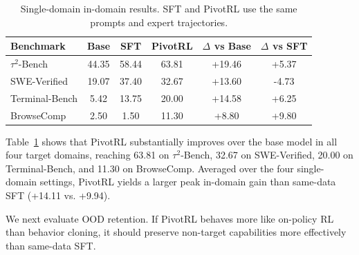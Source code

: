 \begin{table}[t]
\centering
\small
\begin{tabular}{lccccc}
\toprule
\textbf{Benchmark} & \textbf{Base} & \textbf{SFT} & \textbf{PivotRL} & \textbf{$\Delta$ vs Base} & \textbf{$\Delta$ vs SFT} \\
\midrule
$\tau^2$-Bench   & 44.35 & 58.44 & 63.81 & +19.46 & +5.37 \\
SWE-Verified     & 19.07 & 37.40 & 32.67 & +13.60 & -4.73 \\
Terminal-Bench   & 5.42  & 13.75 & 20.00 & +14.58 & +6.25 \\
BrowseComp       & 2.50  & 1.50  & 11.30 & +8.80  & +9.80 \\
\bottomrule
\end{tabular}
\caption{
Single-domain in-domain results.
SFT and PivotRL use the same prompts and expert trajectories.
}
\label{tab:single_domain_main_results}
\end{table}

Table~\ref{tab:single_domain_main_results} shows that PivotRL substantially improves over the base model in all four target domains, reaching 63.81 on $\tau^2$-Bench, 32.67 on SWE-Verified, 20.00 on Terminal-Bench, and 11.30 on BrowseComp. Averaged over the four single-domain settings, PivotRL yields a larger peak in-domain gain than same-data SFT (+14.11 vs. +9.94).

We next evaluate OOD retention. If PivotRL behaves more like on-policy RL than behavior cloning, it should preserve non-target capabilities more effectively than same-data SFT.

